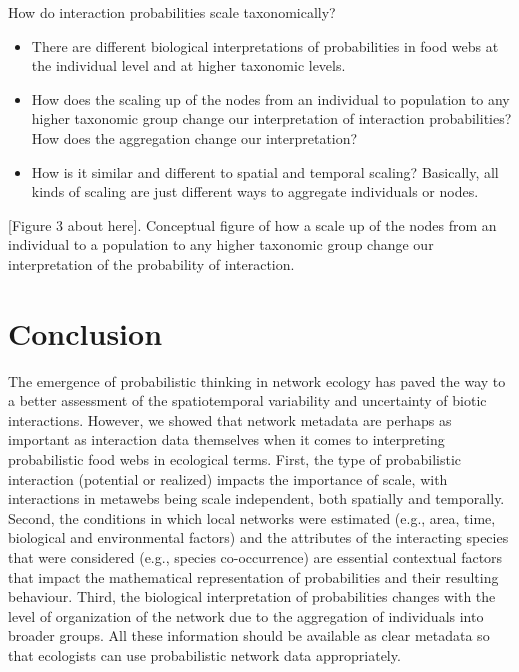 \documentclass[10pt,oneside]{article}
\begin{document}
How do interaction probabilities scale taxonomically?

\begin{itemize}
\tightlist
\item
  There are different biological interpretations of probabilities in
  food webs at the individual level and at higher taxonomic levels.
\item
  How does the scaling up of the nodes from an individual to population
  to any higher taxonomic group change our interpretation of interaction
  probabilities? How does the aggregation change our interpretation?
\item
  How is it similar and different to spatial and temporal scaling?
  Basically, all kinds of scaling are just different ways to aggregate
  individuals or nodes.
\end{itemize}

{[}Figure 3 about here{]}. Conceptual figure of how a scale up of the
nodes from an individual to a population to any higher taxonomic group
change our interpretation of the probability of interaction.

\hypertarget{conclusion}{%
\section{Conclusion}\label{conclusion}}

The emergence of probabilistic thinking in network ecology has paved the
way to a better assessment of the spatiotemporal variability and
uncertainty of biotic interactions. However, we showed that network
metadata are perhaps as important as interaction data themselves when it
comes to interpreting probabilistic food webs in ecological terms.
First, the type of probabilistic interaction (potential or realized)
impacts the importance of scale, with interactions in metawebs being
scale independent, both spatially and temporally. Second, the conditions
in which local networks were estimated (e.g., area, time, biological and
environmental factors) and the attributes of the interacting species
that were considered (e.g., species co-occurrence) are essential
contextual factors that impact the mathematical representation of
probabilities and their resulting behaviour. Third, the biological
interpretation of probabilities changes with the level of organization
of the network due to the aggregation of individuals into broader
groups. All these information should be available as clear metadata so
that ecologists can use probabilistic network data appropriately.
\end{document}
